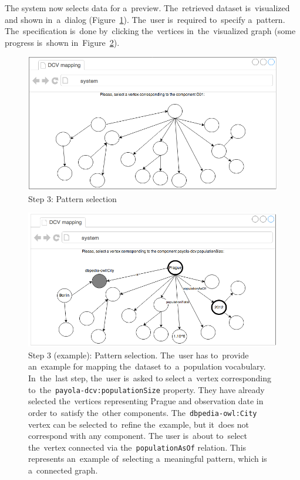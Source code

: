 The system now selects data for a~preview. The~retrieved dataset is~visualized and shown in~a~dialog (Figure~\ref{fig:mockup-03}). The~user is~required to~specify a~pattern. The~specification is~done by~clicking the~vertices in~the~visualized graph (some progress is~shown in~Figure~\ref{fig:mockup-05}).

\begin{figure}
	\centering
	\includegraphics[width=120mm]{img/mockup-03.png}
	\caption{Step 3: Pattern selection}
	\label{fig:mockup-03}
\end{figure}
\begin{figure}
	\centering
	\includegraphics[width=120mm]{img/mockup-05.png}
	\caption{Step 3 (example): Pattern selection. The~user has to~provide an~example
	for mapping the~dataset to~a~population vocabulary. In~the~last step, the~user is~asked
	to select a~vertex corresponding to~the~\texttt{payola-dcv:populationSize} property.
	They have already selected the~vertices representing Prague and observation date
	in order to~satisfy the~other components. The~\texttt{dbpedia-owl:City} vertex can
	be selected to~refine the~example, but it~does not correspond with any component.
	The user is~about to~select the~vertex connected via the~\texttt{populationAsOf} 
	relation. This represents an~example of~selecting a~meaningful pattern, which 
	is a~connected graph.}
	\label{fig:mockup-05}
\end{figure}


